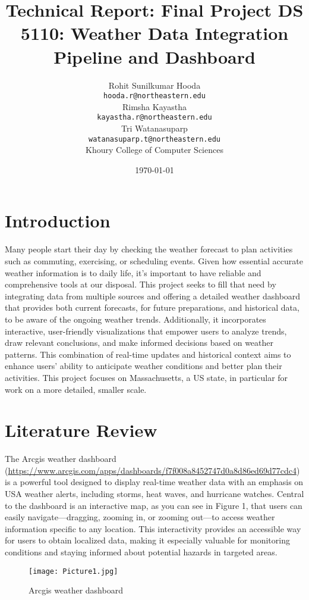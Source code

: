 \documentclass[a4paper, 12pt]{article}
\title{Technical Report: Final Project DS 5110: Weather Data Integration Pipeline and Dashboard
}
\author{
Rohit Sunilkumar Hooda \\ \texttt{hooda.r@northeastern.edu} \\
Rimsha Kayastha \\ \texttt{kayastha.r@northeastern.edu} \\
Tri Watanasuparp \\ \texttt{watanasuparp.t@northeastern.edu} \\
Khoury College of Computer Sciences 
}
\date{\today}
\begin{document}
\maketitle

\tableofcontents
\newpage

\section{Introduction}
\label{sec:introduction}
Many people start their day by checking the weather forecast to plan activities such as commuting, exercising, or scheduling events. Given how essential accurate weather information is to daily life, it’s important to have reliable and comprehensive tools at our disposal. This project seeks to fill that need by integrating data from multiple sources and offering a detailed weather dashboard that provides both current forecasts, for future preparations, and historical data, to be aware of the ongoing weather trends. Additionally, it incorporates interactive, user-friendly visualizations that empower users to analyze trends, draw relevant conclusions, and make informed decisions based on weather patterns. This combination of real-time updates and historical context aims to enhance users’ ability to anticipate weather conditions and better plan their activities. This project focuses on Massachusetts, a US state, in particular for work on a more detailed, smaller scale.


\section{Literature Review}
\label{sec:literature-review}

The Arcgis weather dashboard (\url{https://www.arcgis.com/apps/dashboards/f7f008a8452747d0a8d86ed69d77cdc4}) is a powerful tool designed to display real-time weather data with an emphasis on USA weather alerts, including storms, heat waves, and hurricane watches. Central to the dashboard is an interactive map, as you can see in Figure 1, that users can easily navigate—dragging, zooming in, or zooming out—to access weather information specific to any location. This interactivity provides an accessible way for users to obtain localized data, making it especially valuable for monitoring conditions and staying informed about potential hazards in targeted areas.

\begin{figure}[h!]
\centering
\texttt{[image: Picture1.jpg]} %
\caption{Arcgis weather dashboard}
\label{fig:arcgis-dashboard}
\end{figure}
\end{document}
